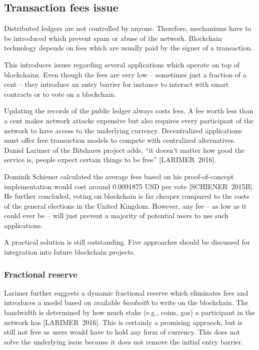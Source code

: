 \documentclass[9pt,oneside]{amsart}
\begin{document}
\begin{multicols}{2}
\subsection{Transaction fees issue}
Distributed ledgers are not controlled by anyone. Therefore, mechanisms have to be introduced which prevent spam or abuse of the network. Blockchain technology depends on fees which are usually paid by the signer of a transaction.\par
This introduces issues regarding several applications which operate on top of blockchains. Even though the fees are very low -- sometimes just a fraction of a cent -- they introduce an entry barrier for instance to interact with smart contracts or to vote on a blockchain.\par
Updating the records of the public ledger always costs fees. A fee worth less than a cent makes network attacks expensive but also requires every participant of the network to have access to the underlying currency. Decentralized applications must offer free transaction models to compete with centralized alternatives. Daniel Larimer of the Bitshares project adds, \enquote{it doesn't matter how good the service is, people expect certain things to be free} [LARIMER~2016].\par
Dominik Schiener calculated the average fees based on his proof-of-concept implementation would cost around 0.0091875 USD per vote [SCHIENER~2015B]. He further concluded, voting on blockchain is far cheaper compared to the costs of the general elections in the United Kingdom. However, any fee -- as low as it could ever be -- will just prevent a majority of potential users to use such applications.\par
A practical solution is still outstanding. Five approaches should be discussed for integration into future blockchain projects.
\subsubsection{Fractional reserve}
Larimer further suggests a dynamic fractional reserve which eliminates fees and introduces a model based on available \textit{bandwith} to write on the blockchain. The bandwidth is determined by how much stake (e.g., coins, gas) a participant in the network has [LARIMER~2016]. This is certainly a promising appraoch, but is still not free as users would have to hold any form of currency. This does not solve the underlying issue because it does not remove the initial entry barrier.

\end{multicols}
\end{document}
